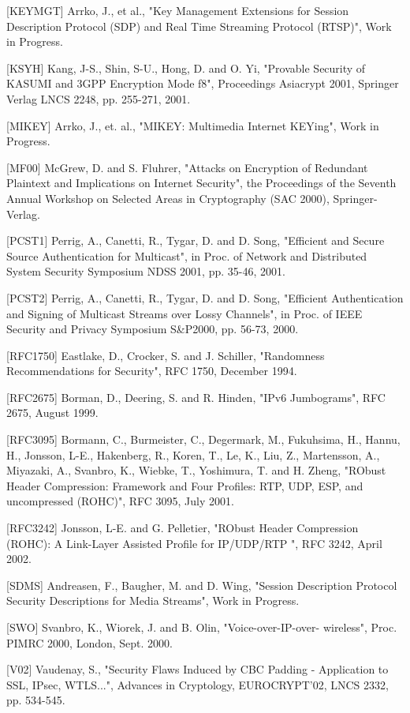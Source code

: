 \documentclass{article}
\begin{document}
[KEYMGT]  Arrko, J., et al., "Key Management Extensions for Session Description Protocol (SDP) and Real Time Streaming Protocol (RTSP)", Work in Progress.

[KSYH]    Kang, J-S., Shin, S-U., Hong, D. and O. Yi, "Provable Security of KASUMI and 3GPP Encryption Mode f8", Proceedings Asiacrypt 2001, Springer Verlag LNCS 2248, pp. 255-271, 2001.

[MIKEY]   Arrko, J., et. al., "MIKEY: Multimedia Internet KEYing", Work in Progress.

[MF00]    McGrew, D. and S. Fluhrer, "Attacks on Encryption of Redundant Plaintext and Implications on Internet Security", the Proceedings of the Seventh Annual Workshop on Selected Areas in Cryptography (SAC 2000), Springer-Verlag.

[PCST1]   Perrig, A., Canetti, R., Tygar, D. and D.  Song, "Efficient and Secure Source Authentication for Multicast", in Proc. of Network and Distributed System Security Symposium NDSS 2001, pp. 35-46, 2001.

[PCST2]   Perrig, A., Canetti, R., Tygar, D. and D. Song, "Efficient Authentication and Signing of Multicast Streams over Lossy Channels", in Proc. of IEEE Security and Privacy Symposium S\&P2000, pp. 56-73, 2000.

[RFC1750] Eastlake, D., Crocker, S. and J. Schiller, "Randomness Recommendations for Security", RFC 1750, December 1994.

[RFC2675] Borman, D., Deering, S. and R. Hinden, "IPv6 Jumbograms", RFC 2675, August 1999.

[RFC3095] Bormann, C., Burmeister, C., Degermark, M., Fukuhsima, H., Hannu, H., Jonsson, L-E., Hakenberg, R., Koren, T., Le, K., Liu, Z., Martensson, A., Miyazaki, A., Svanbro, K., Wiebke, T., Yoshimura, T. and H. Zheng, "RObust Header Compression: Framework and Four Profiles: RTP, UDP, ESP, and uncompressed (ROHC)", RFC 3095, July 2001.

[RFC3242] Jonsson, L-E. and G. Pelletier, "RObust Header Compression (ROHC): A Link-Layer Assisted Profile for IP/UDP/RTP ", RFC 3242, April 2002.

[SDMS]    Andreasen, F., Baugher, M. and D. Wing, "Session Description Protocol Security Descriptions for Media Streams", Work in Progress.

[SWO]     Svanbro, K., Wiorek, J. and B. Olin, "Voice-over-IP-over- wireless", Proc.  PIMRC 2000, London, Sept. 2000.

[V02]     Vaudenay, S., "Security Flaws Induced by CBC Padding - Application to SSL, IPsec, WTLS...", Advances in Cryptology, EUROCRYPT'02, LNCS 2332, pp. 534-545.
\end{document}
